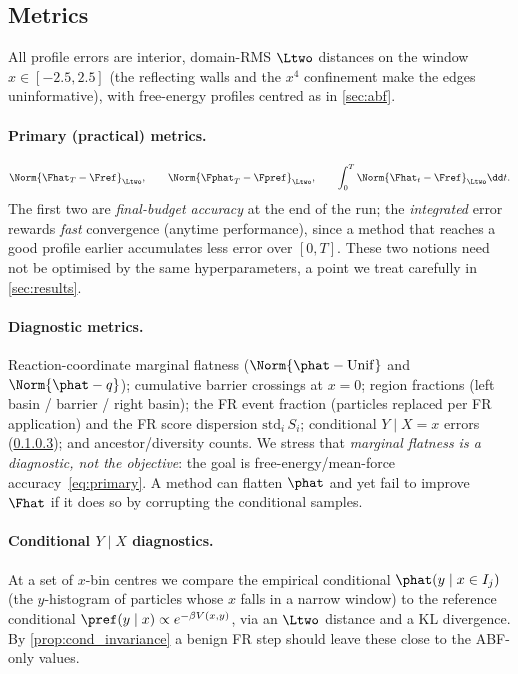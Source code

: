 \subsection{Metrics}
\label{sec:metrics}
All profile errors are interior, domain-RMS $\Ltwo$ distances on the window
$x\in[-2.5,2.5]$ (the reflecting walls and the $x^4$ confinement make the edges
uninformative), with free-energy profiles centred as in \cref{sec:abf}.

\paragraph{Primary (practical) metrics.}
\begin{equation}
  \Norm{\Fhat_T-\Fref}_{\Ltwo},\qquad
  \Norm{\Fphat_T-\Fpref}_{\Ltwo},\qquad
  \int_0^T \Norm{\Fhat_t-\Fref}_{\Ltwo}\dd t.
  \label{eq:primary}
\end{equation}
The first two are \emph{final-budget accuracy} at the end of the run; the
\emph{integrated} error rewards \emph{fast} convergence (anytime performance),
since a method that reaches a good profile earlier accumulates less error over
$[0,T]$. These two notions need not be optimised by the same hyperparameters,
a point we treat carefully in \cref{sec:results}.

\paragraph{Diagnostic metrics.}
Reaction-coordinate marginal flatness ($\Norm{\phat-\mathrm{Unif}}$ and
$\Norm{\phat-q}$); cumulative barrier crossings at $x=0$; region fractions
(left basin / barrier / right basin); the FR event fraction (particles replaced
per FR application) and the FR score dispersion $\mathrm{std}_i\,S_i$;
conditional $Y\mid X=x$ errors (\cref{sec:conditional}); and ancestor/diversity
counts. We stress that \emph{marginal flatness is a diagnostic, not the
objective}: the goal is free-energy/mean-force accuracy~\eqref{eq:primary}. A
method can flatten $\phat$ and yet fail to improve $\Fhat$ if it does so by
corrupting the conditional samples.

\paragraph{Conditional $Y\mid X$ diagnostics.}
\label{sec:conditional}
At a set of $x$-bin centres we compare the empirical conditional
$\phat(y\mid x\in I_j)$ (the $y$-histogram of particles whose $x$ falls in a
narrow window) to the reference conditional
$\pref(y\mid x)\propto e^{-\beta V(x,y)}$, via an $\Ltwo$ distance and a KL
divergence. By \cref{prop:cond_invariance} a benign FR step should leave these
close to the ABF-only values.

